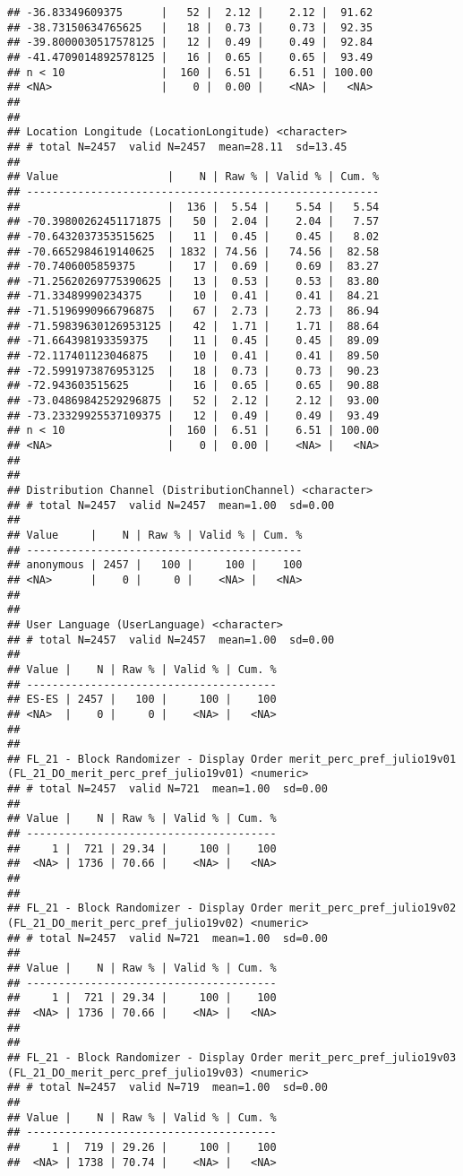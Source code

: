 \documentclass[
  10,
  landscape,
  legalpaper]{article}
\begin{document}
\begin{verbatim}
## -36.83349609375      |   52 |  2.12 |    2.12 |  91.62
## -38.73150634765625   |   18 |  0.73 |    0.73 |  92.35
## -39.8000030517578125 |   12 |  0.49 |    0.49 |  92.84
## -41.4709014892578125 |   16 |  0.65 |    0.65 |  93.49
## n < 10               |  160 |  6.51 |    6.51 | 100.00
## <NA>                 |    0 |  0.00 |    <NA> |   <NA>
## 
## 
## Location Longitude (LocationLongitude) <character>
## # total N=2457  valid N=2457  mean=28.11  sd=13.45
## 
## Value                 |    N | Raw % | Valid % | Cum. %
## -------------------------------------------------------
##                       |  136 |  5.54 |    5.54 |   5.54
## -70.39800262451171875 |   50 |  2.04 |    2.04 |   7.57
## -70.6432037353515625  |   11 |  0.45 |    0.45 |   8.02
## -70.6652984619140625  | 1832 | 74.56 |   74.56 |  82.58
## -70.7406005859375     |   17 |  0.69 |    0.69 |  83.27
## -71.25620269775390625 |   13 |  0.53 |    0.53 |  83.80
## -71.33489990234375    |   10 |  0.41 |    0.41 |  84.21
## -71.5196990966796875  |   67 |  2.73 |    2.73 |  86.94
## -71.59839630126953125 |   42 |  1.71 |    1.71 |  88.64
## -71.664398193359375   |   11 |  0.45 |    0.45 |  89.09
## -72.117401123046875   |   10 |  0.41 |    0.41 |  89.50
## -72.5991973876953125  |   18 |  0.73 |    0.73 |  90.23
## -72.943603515625      |   16 |  0.65 |    0.65 |  90.88
## -73.04869842529296875 |   52 |  2.12 |    2.12 |  93.00
## -73.23329925537109375 |   12 |  0.49 |    0.49 |  93.49
## n < 10                |  160 |  6.51 |    6.51 | 100.00
## <NA>                  |    0 |  0.00 |    <NA> |   <NA>
## 
## 
## Distribution Channel (DistributionChannel) <character>
## # total N=2457  valid N=2457  mean=1.00  sd=0.00
## 
## Value     |    N | Raw % | Valid % | Cum. %
## -------------------------------------------
## anonymous | 2457 |   100 |     100 |    100
## <NA>      |    0 |     0 |    <NA> |   <NA>
## 
## 
## User Language (UserLanguage) <character>
## # total N=2457  valid N=2457  mean=1.00  sd=0.00
## 
## Value |    N | Raw % | Valid % | Cum. %
## ---------------------------------------
## ES-ES | 2457 |   100 |     100 |    100
## <NA>  |    0 |     0 |    <NA> |   <NA>
## 
## 
## FL_21 - Block Randomizer - Display Order merit_perc_pref_julio19v01 (FL_21_DO_merit_perc_pref_julio19v01) <numeric>
## # total N=2457  valid N=721  mean=1.00  sd=0.00
## 
## Value |    N | Raw % | Valid % | Cum. %
## ---------------------------------------
##     1 |  721 | 29.34 |     100 |    100
##  <NA> | 1736 | 70.66 |    <NA> |   <NA>
## 
## 
## FL_21 - Block Randomizer - Display Order merit_perc_pref_julio19v02 (FL_21_DO_merit_perc_pref_julio19v02) <numeric>
## # total N=2457  valid N=721  mean=1.00  sd=0.00
## 
## Value |    N | Raw % | Valid % | Cum. %
## ---------------------------------------
##     1 |  721 | 29.34 |     100 |    100
##  <NA> | 1736 | 70.66 |    <NA> |   <NA>
## 
## 
## FL_21 - Block Randomizer - Display Order merit_perc_pref_julio19v03 (FL_21_DO_merit_perc_pref_julio19v03) <numeric>
## # total N=2457  valid N=719  mean=1.00  sd=0.00
## 
## Value |    N | Raw % | Valid % | Cum. %
## ---------------------------------------
##     1 |  719 | 29.26 |     100 |    100
##  <NA> | 1738 | 70.74 |    <NA> |   <NA>
\end{verbatim}

\normalsize
\end{document}
